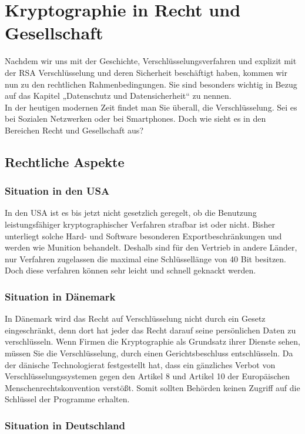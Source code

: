 \chapter{Kryptographie in Recht und Gesellschaft}
Nachdem wir uns mit der Geschichte, Verschlüsselungsverfahren und explizit mit der RSA Verschlüsselung und deren Sicherheit beschäftigt haben, kommen wir nun zu den rechtlichen Rahmenbedingungen. Sie sind besonders wichtig in Bezug auf das Kapitel „Datenschutz und Datensicherheit“ zu nennen. \\

In der heutigen modernen Zeit findet man Sie überall, die Verschlüsselung. Sei es bei Sozialen Netzwerken oder bei Smartphones. Doch wie sieht es in den Bereichen Recht und Gesellschaft aus?

\section{Rechtliche Aspekte}
\subsection{Situation in den USA}

In den USA ist es bis jetzt nicht gesetzlich geregelt, ob die Benutzung leistungsfähiger kryptographischer Verfahren strafbar ist oder nicht. Bisher unterliegt solche Hard- und Software besonderen Exportbeschränkungen und werden wie Munition behandelt. Deshalb sind für den Vertrieb in andere Länder, nur Verfahren zugelassen die maximal eine Schlüssellänge von 40 Bit besitzen. Doch diese verfahren können sehr leicht und schnell geknackt werden.

\subsection{Situation in Dänemark}
In Dänemark wird das Recht auf Verschlüsselung nicht durch ein Gesetz eingeschränkt, denn dort hat jeder das Recht darauf seine persönlichen Daten zu verschlüsseln. Wenn Firmen die Kryptographie als Grundsatz ihrer Dienste sehen, müssen Sie die Verschlüsselung, durch einen Gerichtsbeschluss entschlüsseln. Da der dänische Technologierat festgestellt hat, dass ein gänzliches Verbot von Verschlüsselungssystemen gegen den Artikel 8 und Artikel 10 der Europäischen Menschenrechtskonvention verstößt. Somit sollten Behörden keinen Zugriff auf die Schlüssel der Programme erhalten.

\subsection{Situation in Deutschland}
